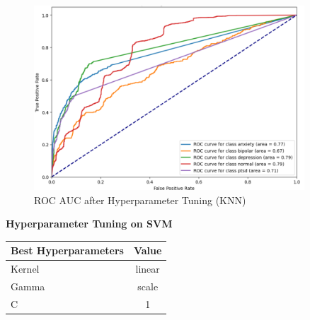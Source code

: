 \begin{figure}[h!]  
    \centering
    \includegraphics[width=0.9\textwidth]{Images/HP KNN ROC.png}  
    \caption{ROC AUC after Hyperparameter Tuning (KNN)}
    \label{LSTMROC5}  %
\end{figure}

\pagebreak

\begin{center}
    \textbf{Hyperparameter Tuning on SVM} \\[0.5em]
    \begin{tabular}{|l|c|}
        \hline
        \textbf{Best Hyperparameters}  & \textbf{Value} \\ \hline
        Kernel                        & linear         \\ \hline
        Gamma                         & scale          \\ \hline
        C                              & 1              \\ \hline
    \end{tabular}
\end{center}

